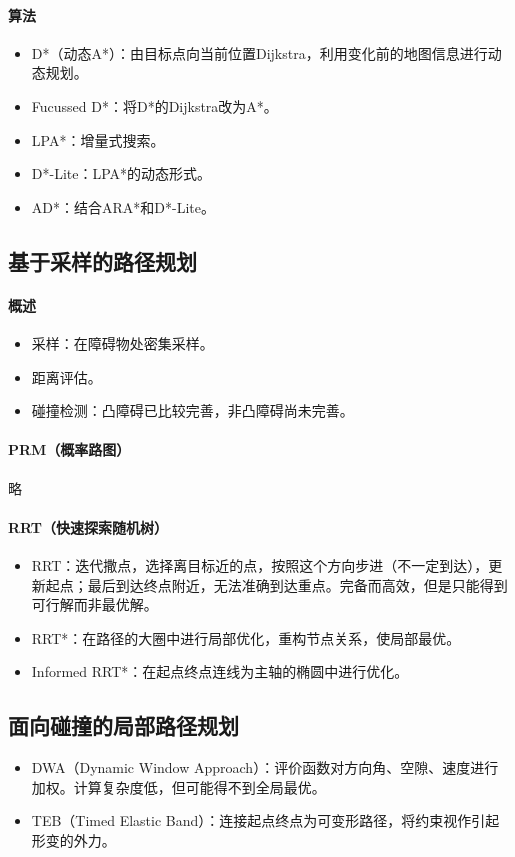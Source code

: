 \documentclass[
12pt, %
a4paper, 
oneside, %
headinclude,footinclude, %
]{scrartcl}
\begin{document}
\paragraph{算法}
\begin{itemize}
\item D*（动态A*）：由目标点向当前位置Dijkstra，利用变化前的地图信息进行动态规划。
\item Fucussed D*：将D*的Dijkstra改为A*。
\item LPA*：增量式搜索。
\item D*-Lite：LPA*的动态形式。
\item AD*：结合ARA*和D*-Lite。
\end{itemize}
\subsection[基于采样的路径规划]{基于采样的路径规划}
\paragraph{概述}
\begin{itemize}
\item 采样：在障碍物处密集采样。
\item 距离评估。
\item 碰撞检测：凸障碍已比较完善，非凸障碍尚未完善。
\end{itemize}
\paragraph{PRM（概率路图）}
略
\paragraph{RRT（快速探索随机树）}
\begin{itemize}
\item RRT：迭代撒点，选择离目标近的点，按照这个方向步进（不一定到达），更新起点；最后到达终点附近，无法准确到达重点。完备而高效，但是只能得到可行解而非最优解。
\item RRT*：在路径的大圈中进行局部优化，重构节点关系，使局部最优。
\item Informed RRT*：在起点终点连线为主轴的椭圆中进行优化。
\end{itemize}
\subsection[面向碰撞的局部路径规划]{面向碰撞的局部路径规划}
\begin{itemize}
\item DWA（Dynamic Window Approach）：评价函数对方向角、空隙、速度进行加权。计算复杂度低，但可能得不到全局最优。
\item TEB（Timed Elastic Band）：连接起点终点为可变形路径，将约束视作引起形变的外力。
\end{itemize}
\end{document}
